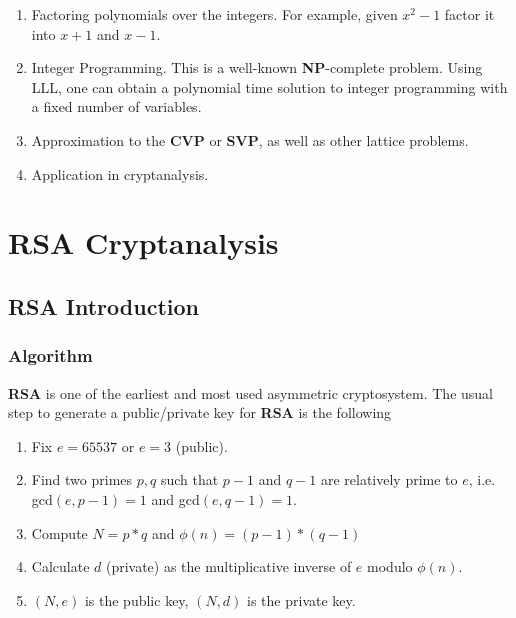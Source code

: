 \documentclass[a4paper,12pt]{report}
\begin{document}
\begin{enumerate}
    \item Factoring polynomials over the integers. For example, given $x^2 - 1$ factor it into $x + 1$ and $x - 1$.
    \item Integer Programming. This is a well-known \textbf{NP}-complete problem. Using LLL, one can obtain a polynomial time solution
          to integer programming with a fixed number of variables.
    \item Approximation to the \textbf{CVP} or \textbf{SVP}, as well as other lattice problems.
    \item Application in cryptanalysis.
\end{enumerate}

\chapter{RSA Cryptanalysis}


\section{RSA Introduction}

\subsection{Algorithm}

\textbf{RSA} is one of the earliest and most used asymmetric cryptosystem.
The usual step to generate a public/private key for \textbf{RSA} is the following

\begin{enumerate}
    \item Fix $e = 65537$ or $e = 3$ (public).
    \item Find two primes $p, q$ such that $p - 1$ and $q - 1$ are relatively prime to $e$, i.e. gcd$(e, p-1) = 1$ and gcd$(e, q-1) = 1$.
    \item Compute $N = p * q$ and $\phi(n) = (p-1) * (q-1)$
    \item Calculate $d$ (private) as the multiplicative inverse of $e$ modulo $\phi(n)$.
    \item $(N, e)$ is the public key, $(N, d)$ is the private key.
\end{enumerate}
\end{document}
